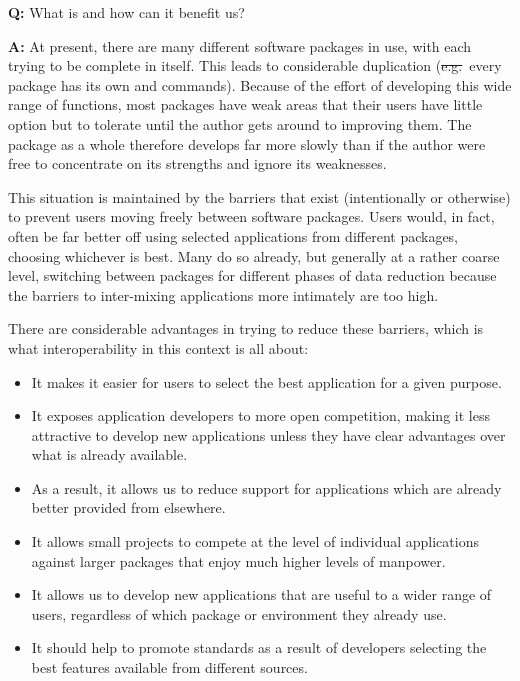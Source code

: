 {\Large \bf Q:} What is  and how can it benefit us?

{\Large \bf A:} At present, there are many different software packages
in use, with each trying to be complete in itself. This leads to
considerable duplication (\st{e.g.}\ every package has its own
 and  commands). Because of the effort of developing
this wide range of functions, most packages have weak areas that their
users have little option but to tolerate until the author gets around
to improving them.  The package as a whole therefore develops far more
slowly than if the author were free to concentrate on its strengths
and ignore its weaknesses.

This situation is maintained by the barriers that exist (intentionally
or otherwise) to prevent users moving freely between software
packages.  Users would, in fact, often be far better off using
selected applications from different packages, choosing whichever is
best.  Many do so already, but generally at a rather coarse level,
switching between packages for different phases of data reduction
because the barriers to inter-mixing applications more intimately are
too high.

There are considerable advantages in trying to reduce these barriers,
which is what interoperability in this context is all about:

\begin{itemize}
\item It makes it easier for users to select the best application for a given
purpose.

\item It exposes application developers to more open competition,
making it less attractive to develop new applications unless they have
clear advantages over what is already available.

\item As a result, it allows us to reduce support for applications which are
already better provided from elsewhere.

\item It allows small projects to compete at the level of individual
 applications against larger packages that enjoy much
higher levels of manpower.

\item It allows us to develop new applications that are useful to a wider
range of users, regardless of which package or environment they
already use.

\item It should help to promote standards as a result of developers
selecting the best features available from different sources.

\end{itemize}

